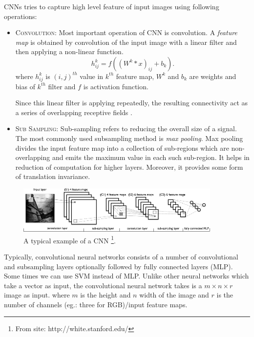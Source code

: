 \noindent CNNs tries to capture high level feature of input images using following operations:
\begin{itemize}
\item \textsc{Convolution}: Most important operation of CNN is convolution. A \textit{feature map} is obtained by convolution of the input image with a linear filter and then applying a non-linear function. 
$$h^k_{ij} = \mathit{f}( (W^k * x)_{ij} + b_k ).$$
where $h^k_{ij}$ is $(i,j)^{th}$ value in $k^{th}$ feature map, $W^k$ and $b_k$ are weights and bias of $k^{th}$ filter and $\mathit{f}$ is activation function.

Since this linear filter is applying repeatedly, the resulting connectivity act as a series of overlapping receptive fields \cite{KarpathyCVPR14}.
\item \textsc{Sub Sampling}: Sub-sampling refers to reducing the overall size of a signal. The most commonly used subsampling method is \textit{max pooling}. Max pooling divides the input feature map into a collection of sub-regions which are non-overlapping and emits the maximum value in each such sub-region. It helps in reduction of computation for higher layers. Moreover, it provides some form of translation invariance. 
\end{itemize}

\begin{figure}[!ht]
\centering
\includegraphics[width=0.9\textwidth]{./imgs/cnn1.png} 
\caption[An example of a convolutional neural network]{A typical example of a CNN \footnote{From site: http://white.stanford.edu/}. }
\label{fig:cnn}
\end{figure}

Typically, convolutional neural networks consists of a number of convolutional and subsampling layers optionally followed by fully connected layers (MLP). Some times we can use SVM instead of MLP. Unlike other neural networks which take a vector as input,  the convolutional neural network takes  is a $m \times n \times r$ image as input. where $m$ is the height and $n$ width of the image and $r$ is the number of channels (eg.: three for RGB)/input feature maps. 

